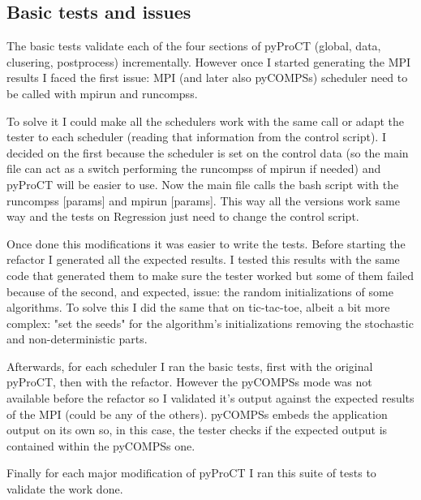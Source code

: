 \subsection{Basic tests and issues}

The basic tests validate each of the four sections of pyProCT (global, data, clusering, postprocess) incrementally. However once I started generating the MPI results I faced the first issue: MPI (and later also pyCOMPSs) scheduler need to be called with mpirun and runcompss. 

To solve it I could make all the schedulers work with the same call or adapt the tester to each scheduler (reading that information from the control script). I decided on the first because the scheduler is set on the control data (so the main file can act as a switch performing the runcompss of mpirun if needed) and pyProCT will be easier to use. Now the main file calls the bash script with the runcompss [params] and mpirun [params]. This way all the versions work same way and the tests on Regression just need to change the control script.

Once done this modifications it was easier to write the tests. Before starting the refactor I generated all the expected results. I tested this results with the same code that generated them to make sure the tester worked but some of them failed because of the second, and expected, issue: the random initializations of some algorithms. To solve this I did the same that on tic-tac-toe, albeit a bit more complex: "set the seeds" for the algorithm's initializations removing the stochastic and non-deterministic parts.

Afterwards, for each scheduler I ran the basic tests, first with the original pyProCT, then with the refactor. However the pyCOMPSs mode was not available before the refactor so I validated it's output against the expected results of the MPI (could be any of the others). pyCOMPSs embeds the application output on its own so, in this case, the tester checks if the expected output is contained within the pyCOMPSs one.

Finally for each major modification of pyProCT I ran this suite of tests to validate the work done.
